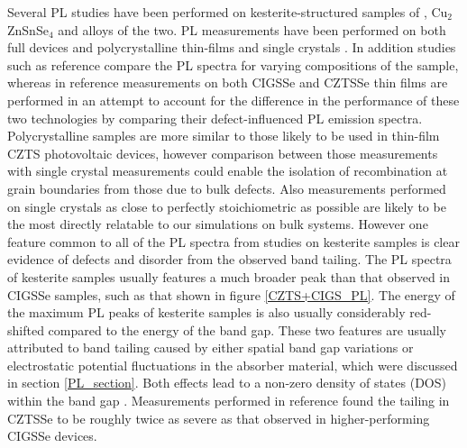 Several PL studies have been performed on kesterite-structured samples of {\CZTS}, Cu$_2$ZnSnSe$_4$ and alloys of the two. PL measurements have been performed on both full devices and polycrystalline thin-films \cite{band_tail, Gershon, Gershon_ref18, Romero, Miyamoto, Unold} and single crystals \cite{Halliday, Levcenko, Hones}. In addition studies such as reference  compare the PL spectra for varying compositions of the sample, whereas in reference  measurements on both CIGSSe and CZTSSe thin films are performed in an attempt to account for the difference in the performance of these two technologies by comparing their defect-influenced PL emission spectra. Polycrystalline samples are more similar to those likely to be used in thin-film CZTS photovoltaic devices, however comparison between those measurements with single crystal measurements could enable the isolation of recombination at grain boundaries from those due to bulk defects. Also measurements performed on single crystals as close to perfectly stoichiometric {\CZTS} as possible are likely to be the most directly relatable to our simulations on bulk systems. However one feature common to all of the PL spectra from studies on kesterite samples is clear evidence of defects and disorder from the observed band tailing. The PL spectra of kesterite samples usually features a much broader peak than that observed in CIGSSe samples, such as that shown in figure \ref{CZTS+CIGS_PL}. The energy of the maximum PL peaks of kesterite samples is also usually considerably red-shifted compared to the energy of the band gap. These two features are usually attributed to band tailing caused by either spatial band gap variations or electrostatic potential fluctuations in the absorber material, which were discussed in section \ref{PL_section}.  Both effects lead to a non-zero density of states (DOS) within the band gap \cite{culprit, band_tail}. 
Measurements performed in reference  found the tailing in CZTSSe to be roughly twice as severe as that observed in higher-performing CIGSSe devices.\\



